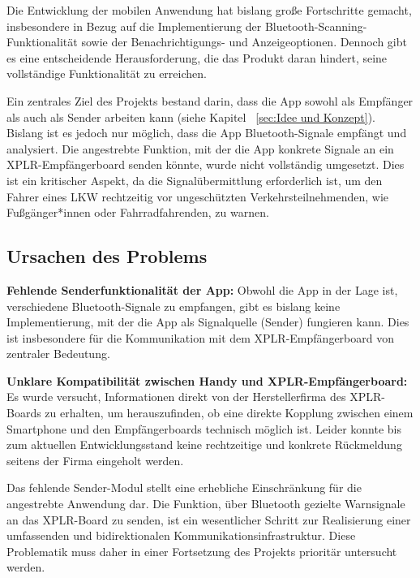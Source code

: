 \documentclass[a4paper, 12pt]{article} %
\begin{document}
\begin{spacing}{1.8}  %
\fontsize{14pt}{15pt}\selectfont  %

Die Entwicklung der mobilen Anwendung hat bislang große Fortschritte gemacht, insbesondere in Bezug auf die Implementierung der Bluetooth-Scanning-Funktionalität sowie der Benachrichtigungs- und Anzeigeoptionen. Dennoch gibt es eine entscheidende Herausforderung, 
die das Produkt daran hindert, seine vollständige Funktionalität zu erreichen.

Ein zentrales Ziel des Projekts bestand darin, dass die App sowohl als Empfänger
 als auch als Sender arbeiten kann (siehe Kapitel ~\ref{sec:Idee und Konzept}). Bislang ist es jedoch nur möglich, dass die App Bluetooth-Signale 
 empfängt und analysiert. Die angestrebte Funktion, mit der die App konkrete Signale an ein XPLR-Empfängerboard 
 senden könnte, wurde nicht vollständig umgesetzt. Dies ist ein kritischer Aspekt, da die Signalübermittlung erforderlich 
 ist, um den Fahrer eines LKW rechtzeitig vor ungeschützten Verkehrsteilnehmenden, wie Fußgänger*innen oder Fahrradfahrenden, zu warnen.

\subsection{Ursachen des Problems}
\textbf{Fehlende Senderfunktionalität der App:}
Obwohl die App in der Lage ist, verschiedene Bluetooth-Signale zu empfangen, 
gibt es bislang keine Implementierung, mit der die App als Signalquelle (Sender) fungieren kann. 
Dies ist insbesondere für die Kommunikation mit dem XPLR-Empfängerboard von zentraler Bedeutung.

\textbf{Unklare Kompatibilität zwischen Handy und XPLR-Empfängerboard:}
Es wurde versucht, Informationen direkt von der Herstellerfirma des 
XPLR-Boards zu erhalten, um herauszufinden, ob eine direkte Kopplung zwischen einem Smartphone 
und den Empfängerboards technisch möglich ist. Leider konnte bis zum aktuellen Entwicklungsstand 
keine rechtzeitige und konkrete Rückmeldung seitens der Firma eingeholt werden.

Das fehlende Sender-Modul stellt eine erhebliche Einschränkung 
für die angestrebte Anwendung dar. Die Funktion, über Bluetooth gezielte Warnsignale an 
das XPLR-Board zu senden, ist ein wesentlicher Schritt zur Realisierung einer umfassenden und bidirektionalen 
Kommunikationsinfrastruktur. Diese Problematik muss daher in einer Fortsetzung des Projekts prioritär untersucht werden.

\end{spacing}
\end{document}
